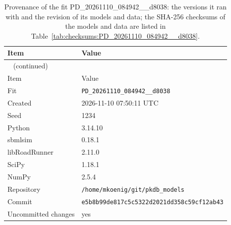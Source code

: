 \documentclass{article}
\begin{document}
\begin{longtable}{ll}
\caption{Provenance of the fit PD\_20261110\_084942\_\_d8038: the versions it ran with and the revision of its models and data; the SHA-256 checksums of the models and data are listed in Table~\ref{tab:checksums:PD_20261110_084942__d8038}.}\label{tab:provenance:PD_20261110_084942__d8038} \\
\toprule
Item & Value \\
\midrule
\endfirsthead
\multicolumn{2}{l}{\small\tablename~\thetable{} (continued)} \\
\toprule
Item & Value \\
\midrule
\endhead
\bottomrule
\endlastfoot
Fit & \texttt{PD\_20261110\_084942\_\_d8038} \\
Created & 2026-11-10 07:50:11 UTC \\
Seed & 1234 \\
Python & 3.14.10 \\
sbmlsim & 0.18.1 \\
libRoadRunner & 2.11.0 \\
SciPy & 1.18.1 \\
NumPy & 2.5.4 \\
Repository & \texttt{/home/mkoenig/git/pkdb\_models} \\
Commit & \texttt{e5b8b99de817c5c5322d2021dd358c59cf12ab43} \\
Uncommitted changes & yes \\
\end{longtable}



\end{document}
